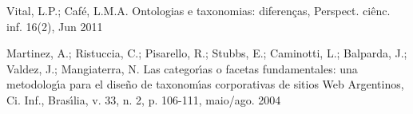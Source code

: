\documentclass[
12pt,		%
openright,	%
twoside,  %
a4paper,			%
chapter=TITLE,		%
english,			%
french,				%
spanish,			%
brazil				%
]{USPSC-classe/USPSC}
\begin{document}
\begin{flushleft}
\begin{flushleft}
\begin{flushleft}
\begin{flushleft}
\begin{flushleft}
\begin{flushleft}
\begin{flushleft}
\begin{flushleft}
 Vital, L.P.; Caf\'e, L.M.A. Ontologias e taxonomias: diferen\c{c}as, Perspect. ci\^enc. inf. 16(2), Jun 2011
\end{flushleft}


\end{flushleft}


\end{flushleft}


\end{flushleft}


\end{flushleft}


\end{flushleft}


\end{flushleft}


\end{flushleft}


\begin{flushleft}
\begin{flushleft}
\begin{flushleft}
\begin{flushleft}
\begin{flushleft}
\begin{flushleft}
\begin{flushleft}
\begin{flushleft}
[MARTINEZ et al., 2004] Martinez, A.; Ristuccia, C.; Pisarello, R.; Stubbs, E.; Caminotti, L.; Balparda, J.; Valdez, J.; Mangiaterra, N. Las categor\'{\i}as o facetas fundamentales: una metodolog\'{\i}a para el diseño de taxonom\'{\i}as corporativas de sitios Web Argentinos, Ci. Inf., Bras\'{\i}lia, v. 33, n. 2, p. 106-111, maio/ago. 2004
\end{flushleft}


\end{flushleft}


\end{flushleft}


\end{flushleft}


\end{flushleft}


\end{flushleft}


\end{flushleft}


\end{flushleft}
\end{document}

